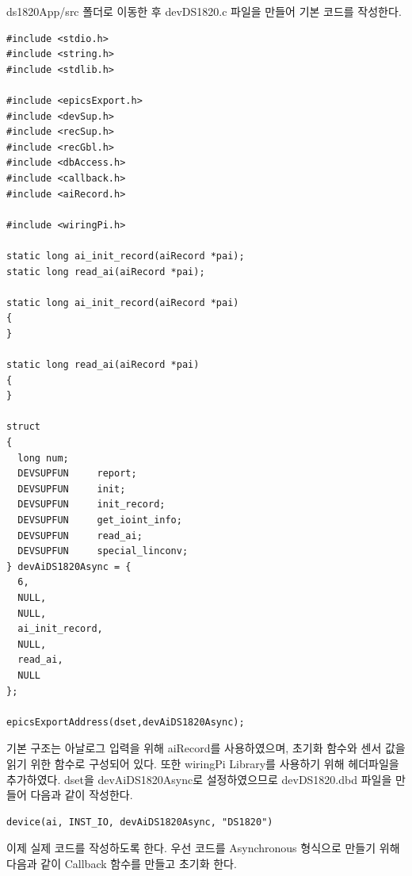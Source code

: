 \documentclass[11pt
  , a4paper
  , article
  , oneside
]{memoir}
\begin{document}
ds1820App/src 폴더로 이동한 후 devDS1820.c 파일을 만들어 기본 코드를 작성한다.
\begin{lstlisting}[style=termstylenumber, caption={Editing \texttt{/etc/fai/NFSROOT}}, label={list:nfsroot-file}]
#include <stdio.h>
#include <string.h>
#include <stdlib.h>

#include <epicsExport.h>
#include <devSup.h>
#include <recSup.h>
#include <recGbl.h>
#include <dbAccess.h>
#include <callback.h>
#include <aiRecord.h>

#include <wiringPi.h>

static long ai_init_record(aiRecord *pai);
static long read_ai(aiRecord *pai);

static long ai_init_record(aiRecord *pai)
{
}

static long read_ai(aiRecord *pai)
{
}

struct
{
  long num;
  DEVSUPFUN     report;
  DEVSUPFUN     init;
  DEVSUPFUN     init_record;
  DEVSUPFUN     get_ioint_info;
  DEVSUPFUN     read_ai;
  DEVSUPFUN     special_linconv;
} devAiDS1820Async = {
  6,
  NULL,
  NULL,
  ai_init_record,
  NULL,
  read_ai,
  NULL
};

epicsExportAddress(dset,devAiDS1820Async);
\end{lstlisting}
기본 구조는 아날로그 입력을 위해 aiRecord를 사용하였으며, 초기화 함수와 센서 값을 읽기 위한 함수로 
구성되어 있다. 또한 wiringPi Library를 사용하기 위해 헤더파일을 추가하였다. dset을 devAiDS1820Async로 
설정하였으므로 devDS1820.dbd 파일을 만들어 다음과 같이 작성한다.
\begin{lstlisting}[style=termstyle]
device(ai, INST_IO, devAiDS1820Async, "DS1820")
\end{lstlisting}
이제 실제 코드를 작성하도록 한다. 우선 코드를 Asynchronous 형식으로 만들기 위해 다음과 같이 Callback 
함수를 만들고 초기화 한다. 
\end{document}
